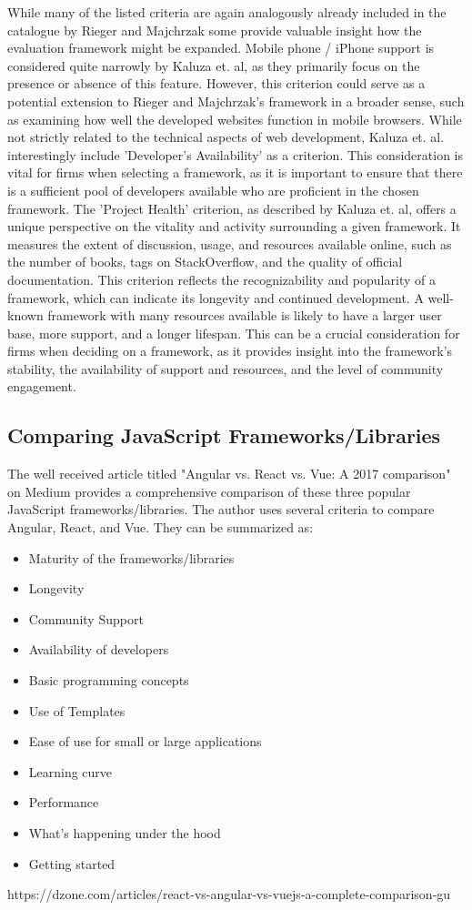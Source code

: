 While many of the listed criteria are again analogously already included in the catalogue by Rieger and Majchrzak some provide valuable insight how the evaluation framework might be expanded. Mobile phone / iPhone support is considered quite narrowly by Kaluza et. al, as they primarily focus on the presence or absence of this feature. However, this criterion could serve as a potential extension to Rieger and Majchrzak's framework in a broader sense, such as examining how well the developed websites function in mobile browsers. While not strictly related to the technical aspects of web development, Kaluza et. al. interestingly include 'Developer's Availability' as a criterion. This consideration is vital for firms when selecting a framework, as it is important to ensure that there is a sufficient pool of developers available who are proficient in the chosen framework. The 'Project Health' criterion, as described by Kaluza et. al, offers a unique perspective on the vitality and activity surrounding a given framework. It measures the extent of discussion, usage, and resources available online, such as the number of books, tags on StackOverflow, and the quality of official documentation. This criterion reflects the recognizability and popularity of a framework, which can indicate its longevity and continued development. A well-known framework with many resources available is likely to have a larger user base, more support, and a longer lifespan. This can be a crucial consideration for firms when deciding on a framework, as it provides insight into the framework's stability, the availability of support and resources, and the level of community engagement.

\subsection{Comparing JavaScript Frameworks/Libraries}

The well received article titled "Angular vs. React vs. Vue: A 2017 comparison" on Medium provides a comprehensive comparison of these three popular JavaScript frameworks/libraries. The author uses several criteria to compare Angular, React, and Vue. They can be summarized as:
\begin{itemize}
    \item Maturity of the frameworks/libraries
    \item Longevity
    \item Community Support
    \item Availability of developers
    \item Basic programming concepts
    \item Use of Templates
    \item Ease of use for small or large applications
    \item Learning curve
    \item Performance
    \item What's happening under the hood
    \item Getting started
\end{itemize}


https://dzone.com/articles/react-vs-angular-vs-vuejs-a-complete-comparison-gu